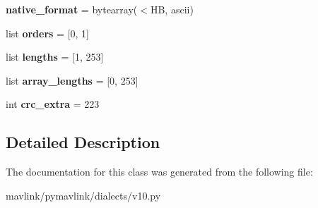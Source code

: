 \begin{DoxyCompactItemize}
{\bfseries native\+\_\+format} = bytearray(\textquotesingle{}$<$HB\textquotesingle{}, \textquotesingle{}ascii\textquotesingle{})
\item 
\mbox{\label{classpymavlink_1_1dialects_1_1v10_1_1MAVLink__encapsulated__data__message_a76f67ea4db543bcc5aa251648e6468c0}} 
list {\bfseries orders} = \mbox{[}0, 1\mbox{]}
\item 
\mbox{\label{classpymavlink_1_1dialects_1_1v10_1_1MAVLink__encapsulated__data__message_a2268ee7183486ad88c8e65378a78a209}} 
list {\bfseries lengths} = \mbox{[}1, 253\mbox{]}
\item 
\mbox{\label{classpymavlink_1_1dialects_1_1v10_1_1MAVLink__encapsulated__data__message_a97768b994fe8acdfba64338ac67b86bd}} 
list {\bfseries array\+\_\+lengths} = \mbox{[}0, 253\mbox{]}
\item 
\mbox{\label{classpymavlink_1_1dialects_1_1v10_1_1MAVLink__encapsulated__data__message_a5503cb80e1a78c2e6a88ab5b5442cdc6}} 
int {\bfseries crc\+\_\+extra} = 223
\end{DoxyCompactItemize}


\subsection{Detailed Description}
\begin{DoxyVerb}\end{DoxyVerb}
 

The documentation for this class was generated from the following file\+:\begin{DoxyCompactItemize}
\item 
mavlink/pymavlink/dialects/v10.\+py\end{DoxyCompactItemize}
